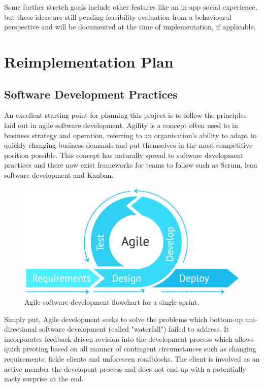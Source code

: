 Some further stretch goals include other features like an in-app social experience, but these ideas are still pending feasibility evaluation from a behavioural perspective and will be documented at the time of implementation, if applicable.

\section{Reimplementation Plan}
\subsection{Software Development Practices}
An excellent starting point for planning this project is to follow the principles laid out in agile software development. Agility is a concept often used to in business strategy and operation, referring to an organisation's ability to adapt to quickly changing business demands and put themselves in the most competitive position possible. This concept has naturally spread to software development practices and there now exist frameworks for teams to follow such as Scrum, lean software development and Kanban.

\begin{figure}[h]
    \begin{center}
        \includegraphics[width=0.6\linewidth]{images/methodology-agile.png}
    \end{center}
    \caption{Agile software development flowchart for a single sprint.}
    \label{fig:agile_flow}
\end{figure}

Simply put, Agile development seeks to solve the problems which bottom-up uni-directional software development (called "waterfall") failed to address. It incorporates feedback-driven revision into the development process which allows quick pivoting based on all manner of contingent circumstances such as changing requirements, fickle clients and unforeseen roadblocks. The client is involved as an active member the developent process and does not end up with a potentially nasty surprise at the end.

